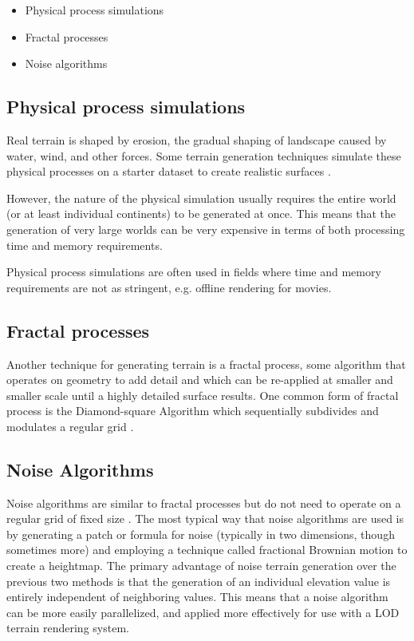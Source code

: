 \begin{itemize}
\item Physical process simulations
\item Fractal processes
\item Noise algorithms
\end{itemize}

\subsection{Physical process simulations}

Real terrain is shaped by erosion, the gradual shaping of landscape caused by water, wind, and other forces.
Some terrain generation techniques simulate these physical processes on a starter dataset to create realistic surfaces \cite{hydrology}.

However, the nature of the physical simulation usually requires the entire world (or at least individual continents) to be generated at once.
This means that the generation of very large worlds can be very expensive in terms of both processing time and memory requirements.

Physical process simulations are often used in fields where time and memory requirements are not as stringent, e.g. offline rendering for movies.


\subsection{Fractal processes}

Another technique for generating terrain is a fractal process, some algorithm that operates on geometry to add detail and which can be re-applied at smaller and smaller scale until a highly detailed surface results.
One common form of fractal process is the Diamond-square Algorithm which sequentially subdivides and modulates a regular grid \cite{def_rend_terrain}.


\subsection{Noise Algorithms}

Noise algorithms are similar to fractal processes but do not need to operate on a regular grid of fixed size \cite{perlin}.
The most typical way that noise algorithms are used is by generating a patch or formula for noise (typically in two dimensions, though sometimes more) and employing a technique called fractional Brownian motion to create a heightmap.
The primary advantage of noise terrain generation over the previous two methods is that the generation of an individual elevation value is entirely independent of neighboring values.
This means that a noise algorithm can be more easily parallelized, and applied more effectively for use with a LOD terrain rendering system.

